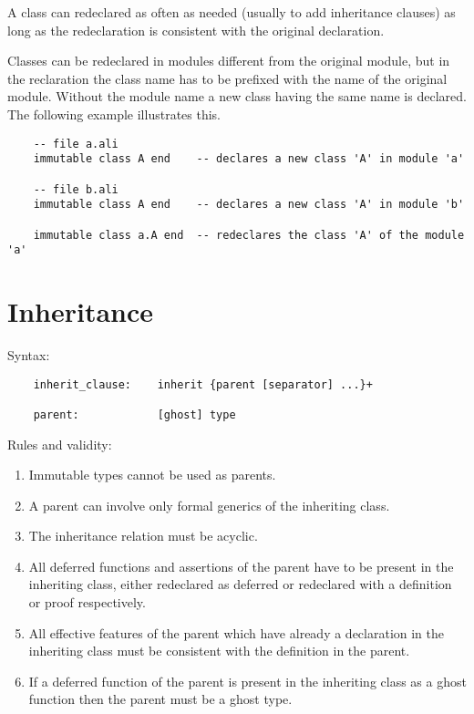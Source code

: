 A class can redeclared as often as needed (usually to add inheritance clauses)
as long as the redeclaration is consistent with the original declaration.

Classes can be redeclared in modules different from the original module, but
in the reclaration the class name has to be prefixed with the name of the
original module. Without the module name a new class having
the same name is declared. The following example illustrates this.

\begin{lstlisting}
    -- file a.ali
    immutable class A end    -- declares a new class 'A' in module 'a'

    -- file b.ali
    immutable class A end    -- declares a new class 'A' in module 'b'

    immutable class a.A end  -- redeclares the class 'A' of the module 'a'
\end{lstlisting}


\section{Inheritance}

\noindent Syntax:
\begin{lstlisting}
    inherit_clause:    inherit {parent [separator] ...}+

    parent:            [ghost] type
\end{lstlisting}

\noindent Rules and validity:
\begin{enumerate}
\item Immutable types cannot be used as parents.

\item A parent can involve only formal generics of the inheriting class.

\item The inheritance relation must be acyclic.

\item All deferred functions and assertions of the parent have to be present
  in the inheriting class, either redeclared as deferred or redeclared with a
  definition or proof respectively.

\item All effective features of the parent which have already a declaration in
  the inheriting class must be consistent with the definition in the parent.

\item If a deferred function of the parent is present in the inheriting class
  as a ghost function then the parent must be a ghost type.
\end{enumerate}

